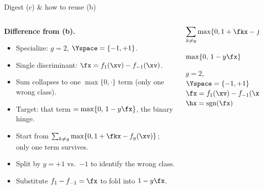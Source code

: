 \documentclass[aspectratio=169]{beamer}
\newcommand{\fyx}{f_y(\xv)}
\begin{document}
\begin{frame}{Digest (c) \& how to reuse (b)}
	\small
	\begin{columns}[T]
	\begin{column}{0.58\textwidth}
		\textbf{Difference from (b).}
		\begin{itemize}
			\item<1-> Specialize: $g = 2$, $\Yspace = \{-1, +1\}$.
			\item<2-> Single discriminant: $\fx = f_1(\xv) - f_{-1}(\xv)$.
			\item<3-> Sum collapses to one $\max\{0,\cdot\}$ term (only one wrong class).
			\item<4-> Target: that term $= \max\{0,\, 1 - y\fx\}$, the binary hinge.
		\end{itemize}

		\vspace{8pt}
		\begin{itemize}
			\item<5-> Start from $\sum_{k\neq y}\max\{0, 1 + \fkx - \fyx\}$; only one term survives.
			\item<6-> Split by $y = +1$ vs.\ $-1$ to identify the wrong class.
			\item<7-> Substitute $f_1 - f_{-1} = \fx$ to fold into $1 - y\fx$.
		\end{itemize}
	\end{column}
	\begin{column}{0.4\textwidth}
		\footnotesize
		\begin{tcolorbox}[
			colback=green!10, colframe=green!45!black,
			boxrule=0.5pt, arc=2pt,
			left=4pt, right=4pt, top=2pt, bottom=2pt,
			title=Starting point (from (b)), fonttitle=\footnotesize\bfseries,
			boxsep=2pt
		]
			$\displaystyle\sum_{k\neq y}\max\{0, 1 + \fkx - \fyx\}$
		\end{tcolorbox}

		\vspace{4pt}
		\begin{tcolorbox}[
			colback=cyan!8, colframe=cyan!55!blue,
			boxrule=0.5pt, arc=2pt,
			left=4pt, right=4pt, top=2pt, bottom=2pt,
			title=Target: binary hinge, fonttitle=\footnotesize\bfseries,
			boxsep=2pt
		]
			$\max\{0,\, 1 - y\fx\}$
		\end{tcolorbox}

		\vspace{4pt}
		\begin{tcolorbox}[
			colback=violet!8, colframe=violet!55!black,
			boxrule=0.5pt, arc=2pt,
			left=4pt, right=4pt, top=2pt, bottom=2pt,
			title=Binary setup, fonttitle=\footnotesize\bfseries,
			boxsep=2pt
		]
			$g = 2$,\ \ $\Yspace = \{-1, +1\}$\\
			$\fx = f_1(\xv) - f_{-1}(\xv)$\\
			$\hx = \mathrm{sgn}(\fx)$
		\end{tcolorbox}
	\end{column}
	\end{columns}
\end{frame}
\end{document}
